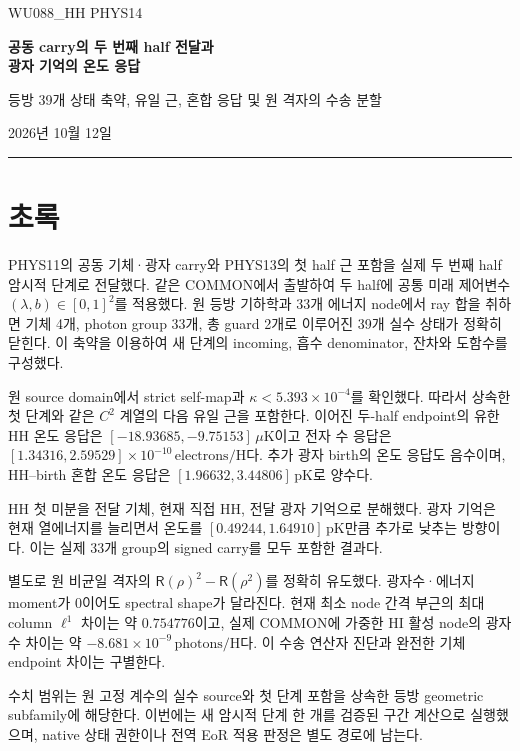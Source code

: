 \documentclass[11pt,a4paper]{article}
\newcommand{\R}{\mathsf R}
\begin{document}
\begin{center}
{\color{MidnightBlue}\sffamily\large WU088\_HH \quad PHYS14}\par
\vspace{5mm}
{\LARGE\bfseries 공동 carry의 두 번째 half 전달과\\[0.25em]광자 기억의 온도 응답}\par
\vspace{4mm}
{\large 등방 39개 상태 축약, 유일 근, 혼합 응답 및 원 격자의 수송 분할}\par
\vspace{2mm}
2026년 10월 12일
\end{center}
\vspace{2mm}
\noindent\rule{\textwidth}{0.6pt}

\section*{초록}
PHYS11의 공동 기체·광자 carry와 PHYS13의 첫 half 근 포함을 실제 두 번째 half 암시적 단계로 전달했다. 같은 COMMON에서 출발하여 두 half에 공통 미래 제어변수 $(\lambda,b)\in[0,1]^2$를 적용했다. 원 등방 기하학과 33개 에너지 node에서 ray 합을 취하면 기체 4개, photon group 33개, 총 guard 2개로 이루어진 39개 실수 상태가 정확히 닫힌다. 이 축약을 이용하여 새 단계의 incoming, 흡수 denominator, 잔차와 도함수를 구성했다.

원 source domain에서 strict self-map과 $\kappa<5.393\times10^{-4}$를 확인했다. 따라서 상속한 첫 단계와 같은 $C^2$ 계열의 다음 유일 근을 포함한다. 이어진 두-half endpoint의 유한 HH 온도 응답은 $[-18.93685,-9.75153]\,\mu\mathrm K$이고 전자 수 응답은 $[1.34316,2.59529]\times10^{-10}\,\mathrm{electrons/H}$다. 추가 광자 birth의 온도 응답도 음수이며, HH--birth 혼합 온도 응답은 $[1.96632,3.44806]\,\mathrm{pK}$로 양수다.

HH 첫 미분을 전달 기체, 현재 직접 HH, 전달 광자 기억으로 분해했다. 광자 기억은 현재 열에너지를 늘리면서 온도를 $[0.49244,1.64910]\,\mathrm{pK}$만큼 추가로 낮추는 방향이다. 이는 실제 33개 group의 signed carry를 모두 포함한 결과다.

별도로 원 비균일 격자의 $\R(\rho)^2-\R(\rho^2)$를 정확히 유도했다. 광자수·에너지 moment가 0이어도 spectral shape가 달라진다. 현재 최소 node 간격 부근의 최대 column $\ell^1$ 차이는 약 $0.754776$이고, 실제 COMMON에 가중한 HI 활성 node의 광자수 차이는 약 $-8.681\times10^{-9}\,\mathrm{photons/H}$다. 이 수송 연산자 진단과 완전한 기체 endpoint 차이는 구별한다.

수치 범위는 원 고정 계수의 실수 source와 첫 단계 포함을 상속한 등방 geometric subfamily에 해당한다. 이번에는 새 암시적 단계 한 개를 검증된 구간 계산으로 실행했으며, native 상태 권한이나 전역 EoR 적용 판정은 별도 경로에 남는다.\cite{result,theory,review}
\end{document}
